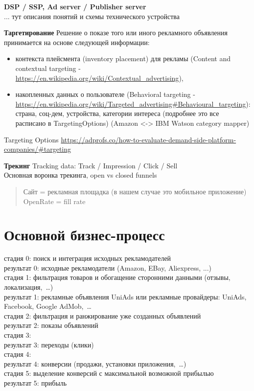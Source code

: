 \documentclass[specification,annotation,times]{itmo-student-thesis}
\begin{document}

\textbf{DSP / SSP, Ad server / Publisher server}
\\
... тут описания понятий и схемы технического устройства


\textbf{Таргетирование}
Решение о показе того или иного рекламного объявления принимается на основе следующей информации:
\begin{itemize}
	\item контекста плейсмента (inventory placement) для рекламы (Content and contextual targeting - \url{https://en.wikipedia.org/wiki/Contextual_advertising}),
	\item накопленных данных о пользователе (Behavioral targeting - \url{https://en.wikipedia.org/wiki/Targeted_advertising#Behavioural_targeting}): страна, соц-дем, устройства, категории интереса (подробнее это все расписано в TargetingOptions) (Amazon <-> IBM Watson category mapper)
\end{itemize}
\bigbreak

Targeting Options \url{https://adprofs.co/how-to-evaluate-demand-side-platform-companies/#targeting}


\textbf{Трекинг}
Tracking data: Track / Impression / Click / Sell
\\
Основная воронка трекинга, open vs closed funnels


\begin{quotation}
  Сайт = рекламная площадка (в нашем случае это мобильное приложение)
  \\
  OpenRate = fill rate

\end{quotation}


\section{Основной бизнес-процесс}

стадия 0: поиск и интеграция исходных рекламодателей
\\
результат 0: исходные рекламодатели (Amazon, EBay, Aliexpress, ...)
\\
стадия 1: фильтрация товаров и обогащение сторонними данными (отзывы, локализация, …)
\\
результат 1: рекламные объявления UniAds или рекламные провайдеры: UniAds, Facebook, Google AdMob, …
\\
стадия 2: фильтрация и ранжирование уже созданных объявлений
\\
результат 2: показы объявлений
\\
стадия 3:
\\
результат 3: переходы (клики)
\\
стадия 4:
\\
результат 4: конверсии (продажи, установки приложения, …)
\\
стадия 5: выделение конверсий с максимальной возможной прибылью
\\
результат 5: прибыль
\\	
\end{document}
